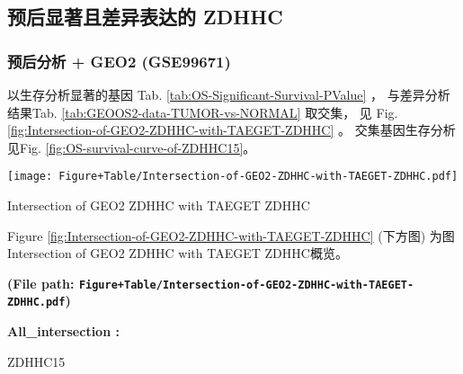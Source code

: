 \documentclass[
]{article}
\begin{document}
\hypertarget{ux9884ux540eux663eux8457ux4e14ux5deeux5f02ux8868ux8fbeux7684-zdhhc}{%
\subsection{预后显著且差异表达的 ZDHHC}\label{ux9884ux540eux663eux8457ux4e14ux5deeux5f02ux8868ux8fbeux7684-zdhhc}}

\hypertarget{ux9884ux540eux5206ux6790-geo2-gse99671}{%
\subsubsection{预后分析 + GEO2 (GSE99671)}\label{ux9884ux540eux5206ux6790-geo2-gse99671}}

以生存分析显著的基因 Tab. \ref{tab:OS-Significant-Survival-PValue} ，
与差异分析结果Tab. \ref{tab:GEOOS2-data-TUMOR-vs-NORMAL} 取交集，
见 Fig. \ref{fig:Intersection-of-GEO2-ZDHHC-with-TAEGET-ZDHHC} 。
交集基因生存分析见Fig. \ref{fig:OS-survival-curve-of-ZDHHC15}。

\begin{center}\vspace{1.5cm}\end{center}
\def\@captype{figure}
\begin{center}
\texttt{[image: Figure+Table/Intersection-of-GEO2-ZDHHC-with-TAEGET-ZDHHC.pdf]}
\caption{Intersection of GEO2 ZDHHC with TAEGET ZDHHC}\label{fig:Intersection-of-GEO2-ZDHHC-with-TAEGET-ZDHHC}
\end{center}

Figure \ref{fig:Intersection-of-GEO2-ZDHHC-with-TAEGET-ZDHHC} (下方图) 为图Intersection of GEO2 ZDHHC with TAEGET ZDHHC概览。

\textbf{(File path: \texttt{Figure+Table/Intersection-of-GEO2-ZDHHC-with-TAEGET-ZDHHC.pdf})}

\begin{center}\vspace{1.5cm}\end{center}\begin{center}\begin{tcolorbox}[colback=gray!10, colframe=gray!50, width=0.9\linewidth, arc=1mm, boxrule=0.5pt]
\textbf{
All\_intersection
:}

\vspace{0.5em}

    ZDHHC15

\vspace{2em}
\end{tcolorbox}
\end{center}
\end{document}
